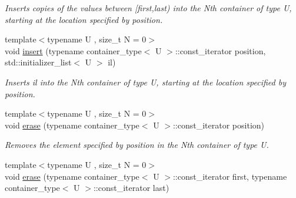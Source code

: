 \begin{DoxyCompactItemize}
\begin{DoxyCompactList}\small\item\em Inserts copies of the values between \mbox{[}first,last) into the Nth container of type U, starting at the location specified by position. \end{DoxyCompactList}\item 
\hypertarget{classheterogeneous_1_1heterodeque_3_01_t_00_01_types_8_8_8_4_ad5d273b51219a7abfb9ac3d2ce7d399b}{}{\footnotesize template$<$typename U , size\+\_\+t N = 0$>$ }\\void \hyperlink{classheterogeneous_1_1heterodeque_3_01_t_00_01_types_8_8_8_4_ad5d273b51219a7abfb9ac3d2ce7d399b}{insert} (typename container\+\_\+type$<$ U $>$\+::const\+\_\+iterator position, std\+::initializer\+\_\+list$<$ U $>$ il)\label{classheterogeneous_1_1heterodeque_3_01_t_00_01_types_8_8_8_4_ad5d273b51219a7abfb9ac3d2ce7d399b}

\begin{DoxyCompactList}\small\item\em Inserts il into the Nth container of type U, starting at the location specified by position. \end{DoxyCompactList}\item 
\hypertarget{classheterogeneous_1_1heterodeque_3_01_t_00_01_types_8_8_8_4_a64776c315544a0e5e46a4f1ea7904ce5}{}{\footnotesize template$<$typename U , size\+\_\+t N = 0$>$ }\\void \hyperlink{classheterogeneous_1_1heterodeque_3_01_t_00_01_types_8_8_8_4_a64776c315544a0e5e46a4f1ea7904ce5}{erase} (typename container\+\_\+type$<$ U $>$\+::const\+\_\+iterator position)\label{classheterogeneous_1_1heterodeque_3_01_t_00_01_types_8_8_8_4_a64776c315544a0e5e46a4f1ea7904ce5}

\begin{DoxyCompactList}\small\item\em Removes the element specified by position in the Nth container of type U. \end{DoxyCompactList}\item 
\hypertarget{classheterogeneous_1_1heterodeque_3_01_t_00_01_types_8_8_8_4_a300ccfcdc15c332f78098ef7624f36fa}{}{\footnotesize template$<$typename U , size\+\_\+t N = 0$>$ }\\void \hyperlink{classheterogeneous_1_1heterodeque_3_01_t_00_01_types_8_8_8_4_a300ccfcdc15c332f78098ef7624f36fa}{erase} (typename container\+\_\+type$<$ U $>$\+::const\+\_\+iterator first, typename container\+\_\+type$<$ U $>$\+::const\+\_\+iterator last)\label{classheterogeneous_1_1heterodeque_3_01_t_00_01_types_8_8_8_4_a300ccfcdc15c332f78098ef7624f36fa}


\end{DoxyCompactItemize}
